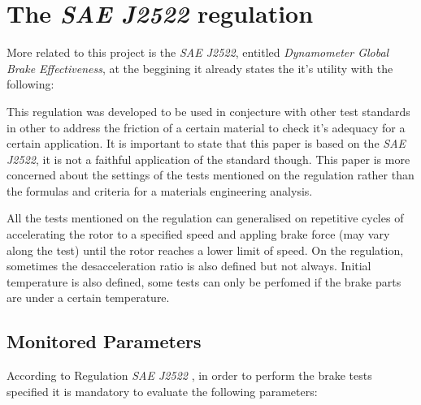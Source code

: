 \section{The \textit{SAE J2522} regulation}\label{the-sae-j2522-regulation}

		More related to this project is the \textit{SAE J2522}, entitled \textit{Dynamometer Global Brake Effectiveness}, at the beggining it already states the it's utility with the following:


		This regulation \cite{saej2522} was developed to be used in conjecture with other test standards in other to address the friction of a certain material to check it's adequacy for a certain application. It is important to state that this paper is based on the \textit{SAE J2522}, it is not a faithful application of the standard though. This paper is more concerned about the settings of the tests mentioned on the regulation rather than the formulas and criteria for a materials engineering analysis.
		\par
		All the tests mentioned on the regulation can generalised on repetitive cycles of accelerating the rotor to a specified speed and appling brake force (may vary along the test) until the rotor reaches a lower limit of speed. On the regulation, sometimes the desacceleration ratio is also defined but not always. Initial temperature is also defined, some tests can only be perfomed if the brake parts are under a certain temperature.

		\subsection{Monitored Parameters}\label{ssec:monitored-parameters}
			According to Regulation \textit{SAE J2522} \cite{saej2522}, in order to perform the brake tests specified it is mandatory to evaluate the following parameters:

